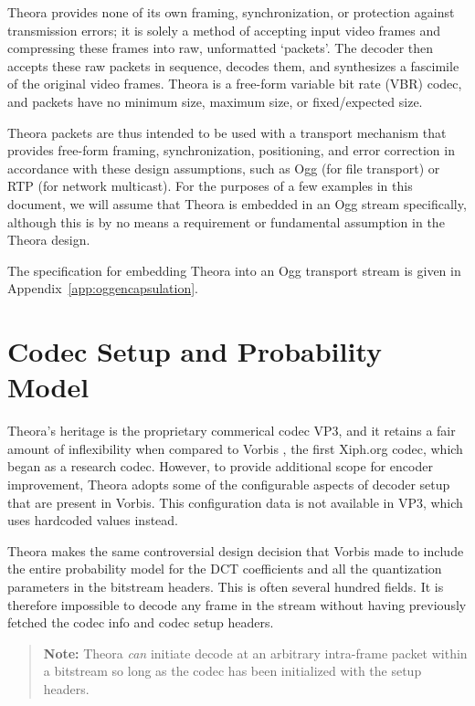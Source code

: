 \documentclass[11pt,letterpaper]{book}
\numberwithin{equation}{chapter}
\numberwithin{figure}{chapter}
\numberwithin{table}{chapter}
\begin{document}
Theora provides none of its own framing, synchronization, or protection against
 transmission errors; it is solely a method of accepting input video frames and
 compressing these frames into raw, unformatted `packets'.
The decoder then accepts these raw packets in sequence, decodes them, and
 synthesizes a fascimile of the original video frames.
Theora is a free-form variable bit rate (VBR) codec, and packets have no
 minimum size, maximum size, or fixed/expected size.

Theora packets are thus intended to be used with a transport mechanism that
 provides free-form framing, synchronization, positioning, and error correction
 in accordance with these design assumptions, such as Ogg (for file transport)
 or RTP (for network multicast).
For the purposes of a few examples in this document, we will assume that Theora
 is embedded in an Ogg stream specifically, although this is by no means a
 requirement or fundamental assumption in the Theora design.

The specification for embedding Theora into an Ogg transport stream is given in
 Appendix~\ref{app:oggencapsulation}.

\section{Codec Setup and Probability Model}

Theora's heritage is the proprietary commerical codec VP3, and it retains a
 fair amount of inflexibility when compared to Vorbis \cite{vorbis}, the first
 Xiph.org codec, which began as a research codec.
However, to provide additional scope for encoder improvement, Theora adopts
 some of the configurable aspects of decoder setup that are present in Vorbis.
This configuration data is not available in VP3, which uses hardcoded values
 instead.

Theora makes the same controversial design decision that Vorbis made to include
 the entire probability model for the DCT coefficients and all the quantization
 parameters in the bitstream headers.
This is often several hundred fields.
It is therefore impossible to decode any frame in the stream without
 having previously fetched the codec info and codec setup headers.

\begin{verse}
{\bf Note:} Theora {\em can} initiate decode at an arbitrary intra-frame packet
 within a bitstream so long as the codec has been initialized with the setup
 headers.
\end{verse}
\end{document}
